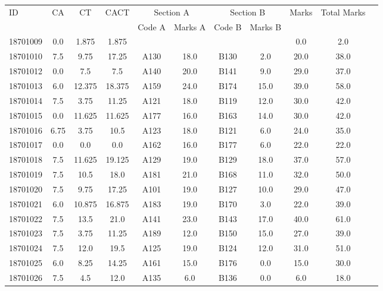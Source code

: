 \documentclass[12pt]{article}
\begin{document}
    \begin{center} 
	\renewcommand{\arraystretch}{1.08}
	\begin{small}
    \begin{tabular}{|l|c|c|c|c|c|c|c|c|c|c|} \hline
	\multirow{2}{*}{ID} & 	\multirow{2}{*}{CA}  & 	\multirow{2}{*}{CT}  & 	\multirow{2}{*}{CACT}  & \multicolumn{2 }{c|}{Section A}& \multicolumn{2 }{c|}{Section B} & 	\multirow{2}{*}{Marks}  & 	\multirow{2}{*}{Total Marks}  \\ 
	&  &  &  & Code A & Marks A & Code B & Marks B&  &  \\ \hline
18701009 & 0.0 & 1.875 & 1.875 &  &  &  &  & 0.0 & 2.0\\ \hline 
18701010 & 7.5 & 9.75 & 17.25 & A130 & 18.0 & B130 & 2.0 & 20.0 & 38.0\\ \hline 
18701012 & 0.0 & 7.5 & 7.5 & A140 & 20.0 & B141 & 9.0 & 29.0 & 37.0\\ \hline 
18701013 & 6.0 & 12.375 & 18.375 & A159 & 24.0 & B174 & 15.0 & 39.0 & 58.0\\ \hline 
18701014 & 7.5 & 3.75 & 11.25 & A121 & 18.0 & B119 & 12.0 & 30.0 & 42.0\\ \hline 
18701015 & 0.0 & 11.625 & 11.625 & A177 & 16.0 & B163 & 14.0 & 30.0 & 42.0\\ \hline 
18701016 & 6.75 & 3.75 & 10.5 & A123 & 18.0 & B121 & 6.0 & 24.0 & 35.0\\ \hline 
18701017 & 0.0 & 0.0 & 0.0 & A162 & 16.0 & B177 & 6.0 & 22.0 & 22.0\\ \hline 
18701018 & 7.5 & 11.625 & 19.125 & A129 & 19.0 & B129 & 18.0 & 37.0 & 57.0\\ \hline 
18701019 & 7.5 & 10.5 & 18.0 & A181 & 21.0 & B168 & 11.0 & 32.0 & 50.0\\ \hline 
18701020 & 7.5 & 9.75 & 17.25 & A101 & 19.0 & B127 & 10.0 & 29.0 & 47.0\\ \hline 
18701021 & 6.0 & 10.875 & 16.875 & A183 & 19.0 & B170 & 3.0 & 22.0 & 39.0\\ \hline 
18701022 & 7.5 & 13.5 & 21.0 & A141 & 23.0 & B143 & 17.0 & 40.0 & 61.0\\ \hline 
18701023 & 7.5 & 3.75 & 11.25 & A189 & 12.0 & B150 & 15.0 & 27.0 & 39.0\\ \hline 
18701024 & 7.5 & 12.0 & 19.5 & A125 & 19.0 & B124 & 12.0 & 31.0 & 51.0\\ \hline 
18701025 & 6.0 & 8.25 & 14.25 & A161 & 15.0 & B176 & 0.0 & 15.0 & 30.0\\ \hline 
18701026 & 7.5 & 4.5 & 12.0 & A135 & 6.0 & B136 & 0.0 & 6.0 & 18.0\\ \hline 

\end{tabular}
\end{small}
\end{center}
\end{document}
